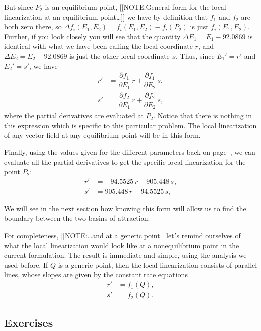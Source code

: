 But since $P_2$ is an equilibrium point, 
[[NOTE:General form for the local linearization at  an equilibrium point\ldots]]
we have by definition that $f_1$ and $f_2$ are both zero there, so
$\Delta f_i(E_1,E_2) = f_i(E_1,E_2) - f_i(P_2)$ is just
$f_i(E_1,E_2)$.  Further, if you look closely you will see that the
quantity $\Delta E_1=E_1-92.0869$ is identical with what we have been
calling the local coordinate $r$, and $\Delta E_2=E_2-92.0869$ is just
the other local coordinate $s$.  Thus, since $E_1'=r'$ and $E_2'=s'$,
we have
\begin{align*}
r'&= \dfrac{\partial f_1}{\partial E_1}\,r 
     + \dfrac{\partial f_1}{\partial E_2}\,s, \\
s'&= \dfrac{\partial f_2}{\partial E_1}\,r 
     + \dfrac{\partial f_2}{\partial E_2}\,s,
\end{align*}
where the partial derivatives are evaluated at $P_2$.  Notice that
there is nothing in this expression which is specific to this
particular problem.  The local linearization of any vector field at
any equilibrium point will be in this form.

Finally, using the values given for the different parameters back on
page~\pageref{`amprob'}, we can evaluate all the partial derivatives
to get the specific local linearization for the point $P_2$:
\begin{align*}
r' &= -94.5525\,r + 905.448\,s, \\
s' &= 905.448\,r - 94.5525\,s,
\end{align*}

We will see in the next section how knowing this form will allow us to
find the boundary between the two basins of attraction.

For completeness, 
[[NOTE:\ldots and at  a generic point]]
let's remind ourselves of what the local linearization would look like
at a nonequilibrium point in the current formulation.  The result is
immediate and simple, using the analysis we used before.  If $Q$ is a
generic point, then the local linearization consists of parallel
lines, whose slopes are given by the constant rate equations
\begin{align*}
r' &= f_1(Q), \\
s' &= f_2(Q).
\end{align*}



\subsection{Exercises}
\label{subsec:exercises}


